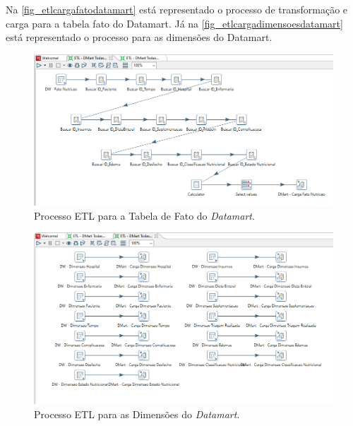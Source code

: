 Na \autoref{fig_etlcargafatodatamart} está representado o processo de transformação e carga para a tabela fato do Datamart. Já na \autoref{fig_etlcargadimensoesdatamart} está representado o processo para as dimensões do Datamart.

\begin{figure}[htb]
	\caption{\label{fig_etlcargafatodatamart}Processo ETL para a Tabela de Fato do \textit{Datamart}.}
	\begin{center}
	    \includegraphics[scale=0.57]{Imagens/figura - etl dm fato.png}
	\end{center}
\end{figure}

\begin{figure}[htb]
	\caption{\label{fig_etlcargadimensoesdatamart}Processo ETL para as Dimensões do \textit{Datamart}.}
	\begin{center}
	    \includegraphics[scale=0.56]{Imagens/figura - etl dm dimensoes.png}
	\end{center}
\end{figure}
            \clearpage

